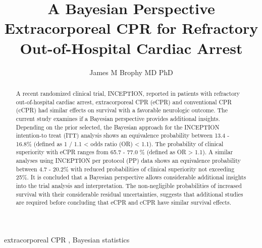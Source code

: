 \documentclass[
  super,
  preprint,
  3p]{elsarticle}
\begin{document}
\begin{frontmatter}
\title{A Bayesian Perspective \\\large{Extracorporeal CPR for Refractory
Out-of-Hospital Cardiac Arrest} }
\author[1]{James M Brophy MD PhD%
%
}


        
\begin{abstract}
A recent randomized clinical trial, INCEPTION, reported in patients with
refractory out-of-hospital cardiac arrest, extracorporeal CPR (eCPR) and
conventional CPR (cCPR) had similar effects on survival with a favorable
neurologic outcome. The current study examines if a Bayesian perspective
provides additional insights. Depending on the prior selected, the
Bayesian approach for the INCEPTION intention-to treat (ITT) analysis
shows an equivalence probability between 13.4 - 16.8\% (defined as 1 /
1.1 \textless{} odds ratio (OR) \textless{} 1.1). The probability of
clinical superiority with eCPR ranges from 65.7 - 77.0 \% (defined as OR
\textgreater{} 1.1). A similar analyses using INCEPTION per protocol
(PP) data shows an equivalence probability between 4.7 - 20.2\% with
reduced probabilities of clinical superiority not exceeding 25\%. It is
concluded that a Bayesian perspective allows considerable additional
insights into the trial analysis and interpretation. The non-negligible
probabilities of increased survival with their considerable residual
uncertainties, suggests that additional studies are required before
concluding that eCPR and cCPR have similar survival effects.
\end{abstract}





\begin{keyword}
    extracorporeal CPR \sep 
    Bayesian statistics
\end{keyword}
\end{frontmatter}
    \ifdefined\Shaded\renewenvironment{Shaded}{\begin{tcolorbox}[breakable, sharp corners, enhanced, interior hidden, boxrule=0pt, borderline west={3pt}{0pt}{shadecolor}, frame hidden]}{\end{tcolorbox}}\fi
\end{document}
